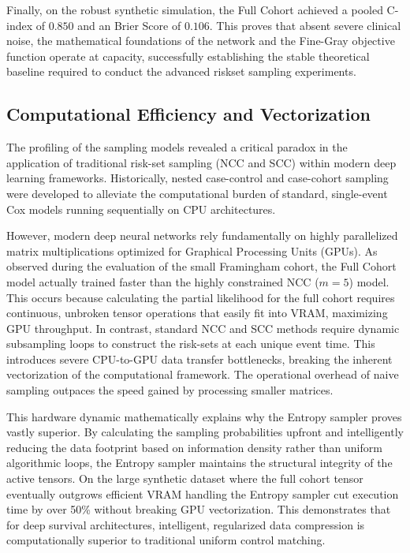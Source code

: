 \documentclass[a4paper,twoside,12pt]{report}
\begin{document}
Finally, on the robust synthetic simulation, the Full Cohort achieved a pooled C-index of $0.850$ and an Brier Score of $0.106$. This proves that absent severe clinical noise, the mathematical foundations of the network and the Fine-Gray objective function operate at capacity, successfully establishing the stable theoretical baseline required to conduct the advanced riskset sampling experiments.

\subsection{Computational Efficiency and Vectorization}

The profiling of the sampling models revealed a critical paradox in the application of traditional risk-set sampling (NCC and SCC) within modern deep learning frameworks. Historically, nested case-control and case-cohort sampling were developed to alleviate the computational burden of standard, single-event Cox models running sequentially on CPU architectures. 

However, modern deep neural networks rely fundamentally on highly parallelized matrix multiplications optimized for Graphical Processing Units (GPUs). As observed during the evaluation of the small Framingham cohort, the Full Cohort model actually trained faster than the highly constrained NCC ($m=5$) model. This occurs because calculating the partial likelihood for the full cohort requires continuous, unbroken tensor operations that easily fit into VRAM, maximizing GPU throughput. In contrast, standard NCC and SCC methods require dynamic subsampling loops to construct the risk-sets at each unique event time. This introduces severe CPU-to-GPU data transfer bottlenecks, breaking the inherent vectorization of the computational framework. The operational overhead of naive sampling outpaces the speed gained by processing smaller matrices.

This hardware dynamic mathematically explains why the Entropy sampler proves vastly superior. By calculating the sampling probabilities upfront and intelligently reducing the data footprint based on information density rather than uniform algorithmic loops, the Entropy sampler maintains the structural integrity of the active tensors. On the large synthetic dataset where the full cohort tensor eventually outgrows efficient VRAM handling the Entropy sampler cut execution time by over 50\% without breaking GPU vectorization. This demonstrates that for deep survival architectures, intelligent, regularized data compression is computationally superior to traditional uniform control matching.
\end{document}
